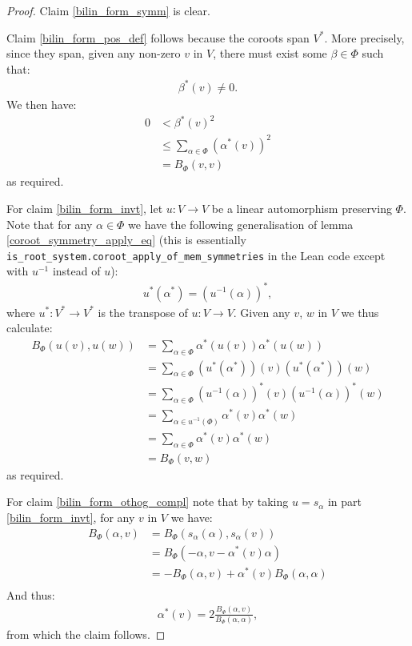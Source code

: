 \documentclass[12pt, a4paper]{article}
\begin{document}
\begin{proof}
  Claim \eqref{bilin_form_symm} is clear.

  Claim \eqref{bilin_form_pos_def} follows because the coroots span $V^*$. More precisely, since
  they span, given any non-zero $v$ in $V$, there must exist some $\beta \in \Phi$ such that:
  \begin{align*}
    \beta^*(v) \ne 0.
  \end{align*}
  We then have:
  \begin{align*}
    0 &< \beta^*(v)^2\\
      &\le \sum_{\alpha \in \Phi}(\alpha^*(v))^2\\
      &= B_\Phi(v, v)
  \end{align*}
  as required.

  For claim \eqref{bilin_form_invt}, let $u : V \to V$ be a linear automorphism preserving $\Phi$.
  Note that for any $\alpha \in \Phi$ we have the following generalisation of lemma
  \ref{coroot_symmetry_apply_eq} (this is essentially
  \texttt{is\_root\_system.coroot\_apply\_of\_mem\_symmetries} in the Lean code except with $u^{-1}$
  instead of $u$):
  \begin{align*}
    u^*(\alpha^*) = (u^{-1}(\alpha))^*,
  \end{align*}
  where $u^* : V^* \to V^*$ is the transpose of $u : V \to V$. Given any $v$, $w$ in $V$ we thus
  calculate:
  \begin{align*}
    B_\Phi(u(v), u(w)) &= \sum_{\alpha \in \Phi}\alpha^*(u(v))\alpha^*(u(w))\\
                       &= \sum_{\alpha \in \Phi}(u^*(\alpha^*))(v)(u^*(\alpha^*))(w)\\
                       &= \sum_{\alpha \in \Phi}(u^{-1}(\alpha))^*(v)(u^{-1}(\alpha))^*(w)\\
                       &= \sum_{\alpha \in u^{-1}(\Phi)}\alpha^*(v)\alpha^*(w)\\
                       &= \sum_{\alpha \in \Phi}\alpha^*(v)\alpha^*(w)\\
                       &= B_\Phi(v, w)
  \end{align*}
  as required.

  For claim \eqref{bilin_form_othog_compl} note that by taking $u = s_\alpha$ in part
  \eqref{bilin_form_invt}, for any $v$ in $V$ we have:
  \begin{align*}
    B_\Phi(\alpha, v) &= B_\Phi(s_\alpha(\alpha), s_\alpha(v))\\
                      &= B_\Phi(-\alpha, v - \alpha^*(v)\alpha)\\
                      &= -B_\Phi(\alpha, v) + \alpha^*(v)B_\Phi(\alpha, \alpha)\\
  \end{align*}
  And thus:
  \begin{align*}
    \alpha^*(v) = 2\frac{B_\Phi(\alpha, v)}{B_\Phi(\alpha, \alpha)},
  \end{align*}
  from which the claim follows.
\end{proof}



\end{document}
